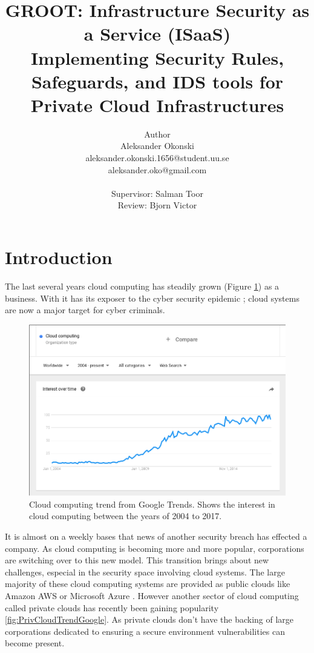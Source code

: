 \documentclass[12pt]{article}
\title{%
    GROOT: Infrastructure Security as a Service (ISaaS)\\
    \large Implementing Security Rules, Safeguards, and IDS tools for Private Cloud Infrastructures}
\author{Author \\
    Aleksander Okonski \\
    aleksander.okonski.1656@student.uu.se \\
    aleksander.oko@gmail.com \\
    \vspace{2cm}
    \\
    Supervisor: Salman Toor \\
    Review: Bjorn Victor }
\date{}
\begin{document}
\maketitle
\newpage
\tableofcontents
\newpage

\section{Introduction}
The last several years cloud computing has steadily grown (Figure \ref{fig:CloudTrendGoogle}) as a business.  With it has its exposer to the cyber security epidemic \cite{kellerman}; cloud systems are now a major target for cyber criminals. 

\begin{figure}[ht]
    \centering
    \includegraphics[scale=.3]{./pic/2017-06-14-130823_923x615_scrot.png}
    \caption{Cloud computing trend from Google Trends. Shows the interest in cloud computing between the years of 2004 to 2017. \cite{GoogleTrendsCloud}}
    \label{fig:CloudTrendGoogle}
\end{figure}

It is almost on a weekly bases that news of another security breach has effected a company. As cloud computing is becoming more and more popular, corporations are switching over to this new model. This transition brings about new challenges, especial in the security space involving cloud systems. The large majority of these cloud computing systems are provided as public clouds like Amazon AWS \cite{amazonAWS} or Microsoft Azure \cite{Azure2017}. However another sector of cloud computing called private clouds has recently been gaining popularity \ref{fig:PrivCloudTrendGoogle}. As private clouds don't have the backing of large corporations dedicated to ensuring a secure environment vulnerabilities can become present. 
\end{document}
